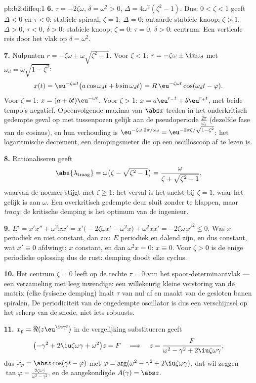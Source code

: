 \begin{solution}{pb:b2:diffeq:1}
\textbf{6.} $\tau = -2\zeta\omega$, $\delta = \omega^2 > 0$,
$\Delta = 4\omega^2(\zeta^2 - 1)$. Dus: $0 < \zeta < 1$ geeft
$\Delta < 0$ en $\tau < 0$: stabiele spiraal; $\zeta = 1$: $\Delta
= 0$: ontaarde stabiele knoop; $\zeta > 1$: $\Delta > 0$, $\tau <
0$, $\delta > 0$: stabiele knoop; $\zeta = 0$: $\tau = 0$, $\delta
> 0$: centrum. Een verticale reis door het vlak op $\delta =
\omega^2$.

\textbf{7.} Nulpunten $r = -\zeta\omega \pm
\omega\sqrt{\zeta^2-1}$. Voor $\zeta < 1$: $r = -\zeta\omega \pm
\iu\omega_d$ met $\omega_d = \omega\sqrt{1-\zeta^2}$:
\[
x(t) = \eu^{-\zeta\omega t}\bigl(a\cos\omega_dt +
b\sin\omega_dt\bigr)
= R\,\eu^{-\zeta\omega t}\cos(\omega_dt - \varphi) .
\]
Voor $\zeta = 1$: $x = (a + bt)\eu^{-\omega t}$. Voor $\zeta > 1$:
$x = a\eu^{r_-t} + b\eu^{r_+t}$, met beide tempo's negatief.
Opeenvolgende maxima van $\abs x$ treden in het onderkritisch
gedempte geval op met tussenpozen gelijk aan de pseudoperiode
$\frac{2\pi}{\omega_d}$ (dezelfde fase van de cosinus), en hun
verhouding is $\eu^{-\zeta\omega\cdot2\pi/\omega_d} =
\eu^{-2\pi\zeta/\sqrt{1-\zeta^2}}$: het logaritmische decrement,
een dempingsmeter die op een oscilloscoop af te lezen is.

\textbf{8.} Rationaliseren geeft
\[
\abs{\lambda_{\mathrm{traag}}} = \omega\bigl(\zeta -
\sqrt{\zeta^2-1}\bigr)
= \frac{\omega}{\zeta + \sqrt{\zeta^2 - 1}} ,
\]
waarvan de noemer stijgt met $\zeta \geq 1$: het verval is het
snelst bij $\zeta = 1$, waar het gelijk is aan $\omega$. Een
overkritisch gedempte deur sluit zonder te klappen, maar
\emph{traag}; de kritische demping is het optimum van de ingenieur.

\textbf{9.} $E' = x'x'' + \omega^2xx' = x'\bigl(-2\zeta\omega x' -
\omega^2x\bigr) + \omega^2xx' = -2\zeta\omega\,x'^2 \leq 0$. Was
$x$ periodiek en niet constant, dan zou $E$ periodiek en dalend
zijn, en dus constant, wat $x' \equiv 0$ afdwingt: $x$ constant, en
dan $\omega^2x = 0$: $x \equiv 0$. Voor $\zeta > 0$ is de enige
periodieke oplossing dus de rust: demping doodt elke cyclus.

\textbf{10.} Het centrum $\zeta = 0$ leeft op de rechte $\tau = 0$
van het spoor-determinantvlak --- een verzameling met leeg
inwendige: een willekeurig kleine verstoring van de matrix (elke
fysische demping) haalt $\tau$ van nul af en maakt van de gesloten
banen spiralen. De periodiciteit van de ongedempte oscillator is
dus een verschijnsel op het scherp van de snede, niet iets
robuusts.

\textbf{11.} $x_p = \Re(z\eu^{\iu\gamma t})$ in de vergelijking
substitueren geeft
\[
\bigl(-\gamma^2 + 2\iu\zeta\omega\gamma +
\omega^2\bigr)z = F
\quad\Longrightarrow\quad
z = \frac{F}{\omega^2 - \gamma^2 + 2\iu\zeta\omega\gamma},
\]
dus $x_p = \abs z\cos(\gamma t - \varphi)$ met $\varphi =
\arg(\omega^2 - \gamma^2 + 2\iu\zeta\omega\gamma)$, dat wil zeggen
$\tan\varphi = \frac{2\zeta\omega\gamma}{\omega^2 - \gamma^2}$, en
de aangekondigde $A(\gamma) = \abs z$.


\end{solution}
